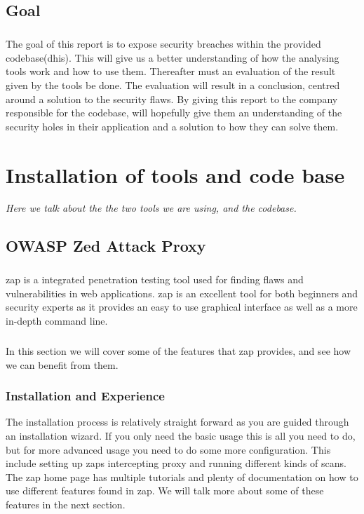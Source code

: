 \documentclass[11pt,english,a4paper]{report}
\begin{document}
\section{Goal}
\paragraph{}
The goal of this report is to expose security breaches within the provided codebase(\gls{dhis}). 
This will give us a better understanding of how the analysing tools work and how to use them. 
Thereafter must an evaluation of the result given by the tools be done. 
The evaluation will result in a conclusion, centred around a solution to the security flaws. 
By giving this report to the company responsible for the codebase, will hopefully give them an understanding of the security holes in their application and a solution to how they can solve them.

\chapter{Installation of tools and code base}
\textit{Here we talk about the the two tools we are using, and the codebase.}

\section{OWASP Zed Attack Proxy}
\paragraph{}
\gls{zap} is a integrated penetration testing tool used for finding flaws and vulnerabilities in web applications. 
\gls{zap} is an excellent tool for both beginners and security experts as it provides an easy to use graphical interface as well as a more in-depth command line.

\paragraph{}
In this section we will cover some of the features that \gls{zap} provides, and see how we can benefit from them.

\subsection{Installation and Experience}
The installation process is relatively straight forward as you are guided through an installation wizard. 
If you only need the basic usage this is all you need to do, but for more advanced usage you need to do some more configuration. 
This include setting up \gls{zap}s intercepting proxy and running different kinds of scans. 
The \gls{zap} home page has multiple tutorials and plenty of documentation on how to use different features found in \gls{zap}. 
We will talk more about some of these features in the next section.
\end{document}
